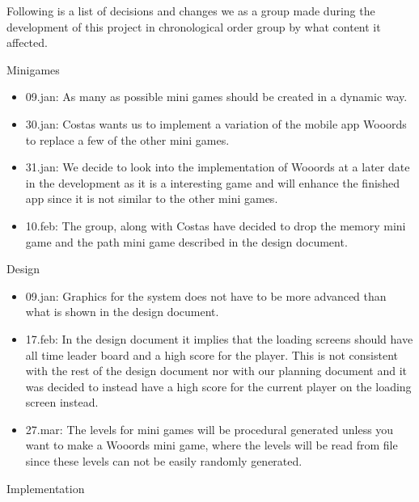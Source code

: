 Following is a list of decisions and changes we as a group made during the development of this project in chronological order group by what content it affected.

Minigames
\begin{itemize}
	
	\item 09.jan: As many as possible mini games should be created in a dynamic way.
	\item 30.jan: Costas wants us to implement a variation of the mobile app Wooords to replace a few of the other mini games.
	\item 31.jan: We decide to look into the implementation of Wooords at a later date in the development as it is a interesting game and will enhance the finished app since it is not similar to the other mini games.
	\item 10.feb: The group, along with Costas have decided to drop the memory mini game and the path mini game described in the design document.
\end{itemize}
Design
\begin{itemize}
	
	\item 09.jan: Graphics for the system does not have to be more advanced than what is shown in the design document.
	\item 17.feb: In the design document it implies that the loading screens should have all time leader board and a high score for the player. This is not consistent with the rest of the design document nor with our planning document and it was decided to instead have a high score for the current player on the loading screen instead.
	\item 27.mar: The levels for mini games will be procedural generated unless you want to make a Wooords mini game, where the levels will be read from file since these levels can not be easily randomly generated.
\end{itemize}
Implementation
